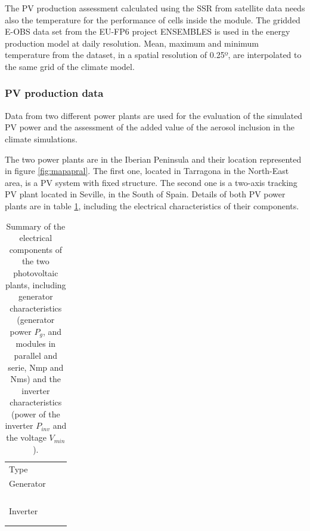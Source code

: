 The PV production assessment calculated using the SSR from satellite data needs also the temperature for the performance of cells inside the module. The gridded E-OBS data set from the EU-FP6 project ENSEMBLES \cite*{Haylock2008} is used in the energy production model at daily resolution. Mean, maximum and minimum temperature from the dataset, in a spatial resolution of 0.25º, are interpolated to the same grid of the climate model. 

\subsubsection{PV production data}

Data from two different power plants are used for the evaluation of the simulated PV power and the assessment of the added value of the aerosol inclusion in the climate simulations.

The two power plants are in the Iberian Peninsula and their location represented in figure \ref{fig:mapapral}. The first one, located in Tarragona in the North-East area, is a PV system with fixed structure. The second one is a two-axis tracking PV plant located in Seville, in the South of Spain. Details of both PV power plants are in table \ref{tabPlants}, including the electrical characteristics of their components. 

\begin{table}[h!]
  \begin{tabular}{>{\raggedright}m{1.5cm}>{\raggedright}m{3cm}>{\raggedright}m{3cm}}
    \toprule 
     & \centering{Seville} & \centering{Tarragona}\tabularnewline
    \midrule
    Type & \centering{two-axes} & \centering{fixed} 
\tabularnewline
    \midrule
    Generator & \centering{$P_{g}=27.31$ $\kilo\wattpeak$}\\ 
                 \centering{$N_{mp}=12$}\\
                 \centering{$N_{ms}=11$} & \centering{$P_g=100.18$ $\kilo\wattpeak$}\\
                               \centering{$N_{mp}=27$}\\
                               \centering{$N_{ms}=35$}
   \tabularnewline
   \midrule
   Inverter & \centering{$P_{inv}=25$ $\kilo\watt$}\\
              \centering{$V_{min}=405$ $\volt$} & \centering{$P_{inv}=100$ $\kilo\wattpeak$}\\
                                \centering{$V_{min}=450$ $\volt$}
    \tabularnewline    
    \bottomrule
  \end{tabular}
  \caption[Electrical components of the PV power plants]{Summary of the electrical components of the two photovoltaic plants, including generator characteristics (generator power $P_g$, and modules in parallel and serie, Nmp and Nms) and the inverter characteristics (power of the inverter $P_{inv}$ and the voltage $V_{min}$).}
  \label{tabPlants}
\end{table}


